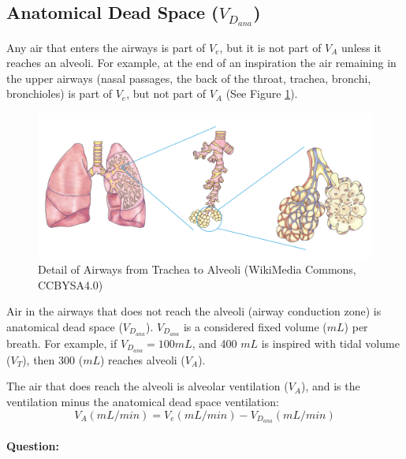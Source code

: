 \subsection{Anatomical Dead Space ($V_D_{ana}$)}

Any air that enters the airways is part of $V_e$, but it is not part of $V_A$ unless it reaches an alveoli. For example, at the end of an inspiration the air remaining in the upper airways (nasal passages, the back of the throat, trachea, bronchi, bronchioles) is part of $V_e$, but not part of $V_A$ (See Figure \ref{fig:airways_detailed}). 

\begin{figure}[!h]
    \centering
    \includegraphics[width=1.0 \linewidth]{./figure/ventilation/airways_detailed.png}
    \caption{Detail of Airways from Trachea to Alveoli \footnotesize{(WikiMedia Commons, CCBYSA4.0)}}
    \label{fig:airways_detailed}
\end{figure}

Air in the airways that does not reach the alveoli (airway conduction zone) is anatomical dead space ($V_D_{ana}$). $V_D_{ana}$ is a considered fixed volume ($mL$) per breath. For example, if $V_D_{ana} = 100 mL$, and 400 $mL$ is inspired with tidal volume ($V_T$), then 300 ($mL$) reaches alveoli ($V_A$). 

The air that does reach the alveoli is alveolar ventilation ($V_A$), and is the ventilation minus the anatomical dead space ventilation:
\vspace{2mm}
\begin{equation}
    V_A (mL/min) = V_e (mL/min) - V_D_{ana} (mL/min)
    \label{eq:Va}
\end{equation}
\vspace{2mm}

\paragraph{Question:}

